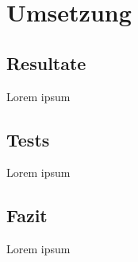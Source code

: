 
\section{Umsetzung}

\subsection{Resultate}
Lorem ipsum
\clearpage

\subsection{Tests}
Lorem ipsum
\clearpage

\subsection{Fazit}
Lorem ipsum
\clearpage
